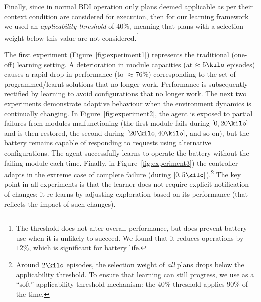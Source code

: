 Finally, since in normal BDI operation only plans deemed applicable as per their context condition are considered for execution, then for our learning framework we used an \emph{applicability threshold} of $40\%$, meaning that plans with a selection weight below this value are not considered.\footnote{The threshold does not alter overall performance, but does prevent battery use when it is unlikely to succeed. We found that it reduces operations by $12\%$, which is significant for battery life.}

The first experiment (Figure~\ref{fig:experiment1}) represents the traditional (one-off) learning setting. A deterioration in module capacities (at $\approx 5\kilo$ episodes) causes a rapid drop in performance (to $\approx 76\%$) corresponding to the set of programmed/learnt solutions that no longer work. Performance is subsequently rectified by learning to avoid configurations that no longer work. 
%
%
%
The next two experiments demonstrate adaptive behaviour when the environment dynamics is continually changing.
%
In Figure~\ref{fig:experiment2}, the agent is exposed to partial failures from modules malfunctioning (the first module fails during $[0,20\kilo]$ and is then restored, the second during $[20\kilo,40\kilo]$, and so on), but the battery remains capable of responding to requests using alternative configurations. The agent successfully learns to operate the battery without the failing module  each time.
%
Finally, in Figure~\ref{fig:experiment3}) the controller adapts in the extreme case of complete failure (during $[0,5\kilo]$).\footnote{Around $2\kilo$ episodes, the selection weight of {\em all} plans drops below the applicability threshold. To ensure that learning can still progress, we use as a ``soft'' applicability threshold mechanism: the $40\%$ threshold applies $90\%$ of the time.}
%
The key point in all experiments is that the learner does not require explicit notification of changes: it re-learns by adjusting exploration based on its performance (that reflects the impact of such changes).
